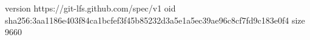 version https://git-lfs.github.com/spec/v1
oid sha256:3aa1186e403f84ca1bcfef3f45b85232d3a5e1a5ec39ae96c8cf7fd9c183e0f4
size 9660
